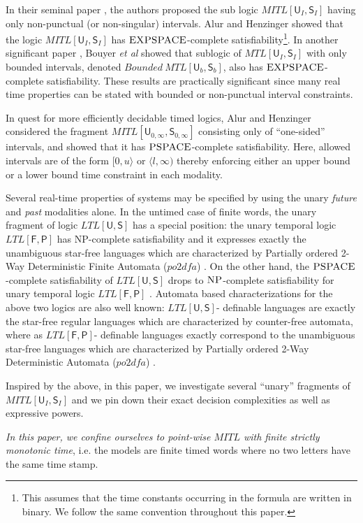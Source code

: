 \documentclass{llncs}
\newcommand{\class}{\textsc}
\newcommand{\until}{\textsf{U}}
\newcommand{\since}{\textsf{S}}
\newcommand{\fut}{\textsf{F}}
\newcommand{\past}{\textsf{P}}
\newcommand{\POTDFA}{\mbox{$\mathit{po2dfa}$}}
\newcommand{\oomit}[1]{}
\newcommand{\mtlus}{\mbox{$\mathit{MTL[\until_I,\since_I]}$}}
\newcommand{\mitlus}{\mbox{$\mathit{MITL[\until_I,\since_I]}$}}
\newcommand{\bmtlus}{\mbox{$\mathit{Bounded ~MTL[\until_b,\since_b]}$}}
\newcommand{\potdfa}{\POTDFA}
\newcommand{\mtlusb}{\bmtlus}
\newcommand{\mitl}{\mbox{$\mathit{MITL}$}}
\newcommand{\mtl}{\mbox{$\mathit{MTL}$}}
\newcommand{\ltlus}{\mbox{$\mathit{LTL[\until,\since]}$}}
\newcommand{\ltlfp}{\mbox{$\mathit{LTL[\fut,\past]}$}}
\newcommand{\mitluszinf}{\mbox{$\mathit{MITL[\until_{0,\infty},\since_{0,\infty}]}$}}
\newcommand{\pspace}{\mbox{$\class{PSPACE}$}}
\newcommand{\expspace}{\mbox{$\class{EXPSPACE}$}}
\newcommand{\np}{\mbox{$\class{NP}$}}
\begin{document}
In their seminal paper \cite{AFH96}, the authors proposed the sub logic $\mitlus$ having only non-punctual (or non-singular) intervals.  Alur and Henzinger \cite{AFH96,AH92} showed that the logic \mitlus\/ has \expspace-complete satisfiability\footnote{This assumes that the time constants occurring in the formula are written in binary. We follow the same convention throughout this paper.}. 
In another significant paper \cite{BMOW08}, Bouyer {\em et al} showed that sublogic of $\mtlus$ with only bounded intervals, denoted $\mtlusb$, also has \expspace-complete satisfiability. These results are practically significant since many real time properties can be stated with bounded or non-punctual interval constraints.

In quest for more efficiently decidable timed logics, Alur and Henzinger considered the fragment \mitluszinf\/ consisting only of ``one-sided'' intervals, and showed that it  has \pspace-complete satisfiability. Here, allowed intervals are of the form $[0,u\rangle$   or $\langle l,\infty)$ thereby enforcing either an upper bound or a lower bound time constraint in each modality.  

Several real-time properties of systems may be specified by using the unary \emph{future} and \emph{past} modalities alone. In the untimed case of finite words, the unary fragment of logic \ltlus\/ has a  special position: the  unary temporal logic $\ltlfp$ has NP-complete satisfiability 
\cite{EVW02} and it expresses exactly the unambiguous star-free languages which are characterized by Partially ordered 2-Way Deterministic Finite Automata (\potdfa) \cite{STV01}. 
On the other hand, the \pspace-complete satisfiability of $\ltlus$  drops to \np-complete satisfiability for unary temporal logic $\ltlfp$\/ \cite{EVW02}.
Automata based characterizations for the above two logics are also well known: \ltlus\/- definable languages are exactly the star-free regular languages  which are characterized by counter-free automata, where as \ltlfp\/- definable languages exactly correspond to the unambiguous star-free languages \cite{TT02} which are characterized by Partially ordered 2-Way Deterministic Automata (\potdfa) \cite{STV01}. 


Inspired by the above, in this paper, we investigate several ``unary'' fragments of \mitlus\/ and we pin down their exact decision complexities as well as expressive powers.
\oomit{
Metric temporal logic can be defined over various classes of time frames, such as point-wise or continuous time. Moreover, the behaviors may be infinite or finite. The decidability and expressiveness of $\mtl$ changes very significantly with the nature of time \cite{OW07,DP07}. }
\emph{In this paper, we confine ourselves to point-wise $\mitl$ with finite strictly monotonic time}, i.e. the models are finite timed words where no two letters have the same time stamp. 
\end{document}
